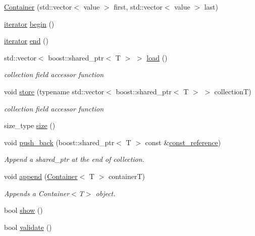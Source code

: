 \begin{DoxyCompactItemize}
\item 
\hyperlink{class_container_a1ed1d5384e85f713e40bfb539e23c9ce}{Container} (std::vector$<$ value $>$ first, std::vector$<$ value $>$ last)
\item 
\hyperlink{class_container_afe880028d8304353129f47cd1d28c20a}{iterator} \hyperlink{class_container_ac5e2a75311f6e6a690ca67603490ddb1}{begin} ()
\item 
\hyperlink{class_container_afe880028d8304353129f47cd1d28c20a}{iterator} \hyperlink{class_container_a266eabe62963d6909d3aca7f105e203e}{end} ()
\item 
std::vector$<$ boost::shared\_\-ptr$<$ T $>$ $>$ \hyperlink{class_container_a9161a87726434f8955398137c647947c}{load} ()
\begin{DoxyCompactList}\small\item\em collection field accessor function \end{DoxyCompactList}\item 
void \hyperlink{class_container_a601371159ddfee9ab29b676207a0cf75}{store} (typename std::vector$<$ boost::shared\_\-ptr$<$ T $>$ $>$ collectionT)
\begin{DoxyCompactList}\small\item\em collection field accessor function \end{DoxyCompactList}\item 
size\_\-type \hyperlink{class_container_a842c3d9eca81b78b59112fde9707b091}{size} ()
\item 
void \hyperlink{class_container_a1f00050a4bd892699f05f8528afcea2e}{push\_\-back} (boost::shared\_\-ptr$<$ T $>$ const \&\hyperlink{class_container_a8dd7ae9d0687e11d873f98206e961ac1}{const\_\-reference})
\begin{DoxyCompactList}\small\item\em Append a shared\_\-ptr at the end of collection. \end{DoxyCompactList}\item 
void \hyperlink{class_container_a86d42cf807e073724bd2f8e08dcdfefa}{append} (\hyperlink{class_container}{Container}$<$ T $>$ containerT)
\begin{DoxyCompactList}\small\item\em Appends a Container$<$T$>$ object. \end{DoxyCompactList}\item 
bool \hyperlink{class_container_ad72379ee222b073a5eecec7fc1bedfc2}{show} ()
\item 
bool \hyperlink{class_container_aa99a036fd0fe6d6b82ba558157e557d3}{validate} ()

\end{DoxyCompactItemize}
